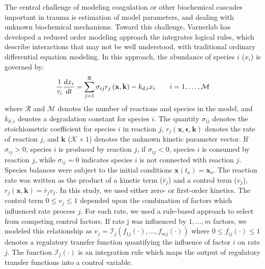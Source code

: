 \documentclass[11pt]{article}
\begin{document}
The central challenge of modeling coagulation or other biochemical cascades important in trauma is estimation of model parameters, and dealing with unknown biochemical mechanisms.
Toward this challenge, Varnerlab has developed a reduced order modeling approach the integrates logical rules, which describe interactions that may not be
well understood, with traditional ordinary differential equation modeling.
In this approach, the abundance of species $i$ ($x_{i}$) is governed by:
\begin{equation}
	\frac{1}{\tau_{i}}\frac{dx_{i}}{dt}  =  \sum_{j = 1}^{\mathcal{R}}\sigma_{ij}r_{j}\left(\mathbf{x},\mathbf{k}\right) - k_{d,i}x_{i}\qquad{i=1,\hdots,\mathcal{M}}\\
\end{equation}
where $\mathcal{R}$ and $\mathcal{M}$ denotes the number of reactions and species in the model, and $k_{d,i}$ denotes a degradation constant for species $i$.
The quantity $\sigma_{ij}$ denotes the stoichiometric coefficient for species $i$ in reaction $j$,
$r_{j}\left(\mathbf{x},\mathbf{\epsilon},\mathbf{k}\right)$ denotes the rate of reaction $j$, and $\mathbf{k}$ ($\mathcal{K}\times{1}$) denotes the unknown kinetic parameter vector.
If $\sigma_{ij}>0$, species $i$ is produced by reaction $j$, if $\sigma_{ij}<0$, species $i$ is consumed by reaction $j$,
while $\sigma_{ij} = 0$ indicates species $i$ is not connected with reaction $j$.
Species balances were subject to the initial conditions $\mathbf{x}\left(t_{o}\right) = \mathbf{x}_{o}$.
The reaction rate was written as the product of a kinetic term ($\bar{r}_{j}$) and a control term ($v_{j}$), $r_{j}\left(\mathbf{x},\mathbf{k}\right) = \bar{r}_{j}v_{j}$.
In this study, we used either zero- or first-order kinetics.
The control term $0\leq v_{j}\leq 1$ depended upon the combination of factors which influenced rate process $j$.
For each rate, we used a rule-based approach to select from competing control factors.
If rate j was influenced by $1,\dots,m$ factors, we modeled this relationship as
$v_{j} = \mathcal{I}_{j}\left(f_{1j}\left(\cdot\right),\hdots,f_{mj}\left(\cdot\right)\right)$
where $0\leq f_{ij}\left(\cdot\right)\leq 1$ denotes a regulatory transfer function quantifying the influence of factor $i$ on rate $j$.
The function $\mathcal{I}_{j}\left(\cdot\right)$ is an integration rule which maps the output of regulatory transfer functions into a control
variable.
\end{document}

